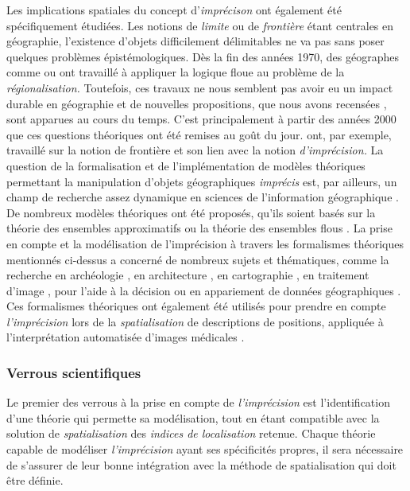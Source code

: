 Les implications spatiales du concept d'\emph{imprécison} ont
également été spécifiquement étudiées. Les notions de \emph{limite} ou
de \emph{frontière} étant centrales en géographie, l’existence
d'objets difficilement délimitables ne va pas sans poser quelques
problèmes épistémologiques. Dès la fin des années 1970, des géographes
comme \textcite{Gale1976} ou \textcite{Leung1979} ont travaillé à
appliquer la logique floue au problème de la \emph{régionalisation.}
Toutefois, ces travaux ne nous semblent pas avoir eu un impact durable
en géographie et de nouvelles propositions, que nous avons recensées
\autocite{Bunel2020}, sont apparues au cours du temps. C'est
principalement à partir des années 2000 que ces questions théoriques
ont été remises au goût du
jour. \textcite{Varzi2001,Varzi2015,Smith2000,Collins2000} ont, par
exemple, travaillé sur la notion de frontière et son lien avec la
notion \emph{d'imprécision.} La question de la formalisation et de
l'implémentation de modèles théoriques permettant la manipulation
d'objets géographiques \emph{imprécis} est, par ailleurs, un champ de
recherche assez dynamique en sciences de l'information géographique
\autocite{Bunel2020}. De nombreux modèles théoriques ont été proposés,
qu'ils soient basés sur la théorie des ensembles approximatifs
\autocite{Schneider1996,Cohn1996,Clementini1996} ou la théorie des
ensembles flous \autocite{Schneider1999}. La prise en compte et la
modélisation de l'imprécision à travers les formalismes théoriques
mentionnés ci-dessus a concerné de nombreux sujets et thématiques,
comme la recherche en archéologie \autocite{Runz2008a, Zoghlami2016},
en architecture \autocite{Arabacioglu2010}, en cartographie
\autocite{Didelon2009,Didelon2011}, en traitement d'image
\autocite{Brandtberg2002}, pour l'aide à la décision
\autocite{Griot2007,Makropoulos2003} ou en appariement de données
géographiques \autocite{Olteanu2008}. Ces formalismes théoriques ont
également été utilisés pour prendre en compte \emph{l'imprécision}
lors de la \emph{spatialisation} de descriptions de positions,
appliquée à l'interprétation automatisée d'images médicales
\autocite{Takemura2012,Vanegas2011,Bloch1996,Hudelot2008}.

\subsubsection{Verrous scientifiques}

Le premier des verrous à la prise en compte de \emph{l'imprécision}
est l'identification d'une théorie qui permette sa modélisation, tout
en étant compatible avec la solution de \emph{spatialisation} des
\emph{indices de localisation} retenue. Chaque théorie capable de
modéliser \emph{l'imprécision} ayant ses spécificités propres, il sera
nécessaire de s'assurer de leur bonne intégration avec la méthode de
spatialisation qui doit être définie.

